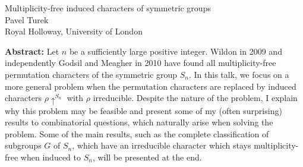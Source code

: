 \documentclass[12pt,a4paper]{article}
\begin{document}
\thispagestyle{empty} 
\begin{center}
{\large Multiplicity-free induced characters of symmetric groups}\\
\vspace*{.5cm}
Pavel Turek\\
Royal Holloway, University of London\\
\end{center}
\vspace*{.8cm}

{\bf Abstract:} Let $n$ be a sufficiently large positive integer. Wildon in 2009 and independently Godsil and Meagher in 2010 have found all multiplicity-free permutation characters of the symmetric group $S_n$. In this talk, we focus on a more general problem when the permutation characters are replaced by induced characters $\rho\!\uparrow^{S_n}$ with $\rho$ irreducible. Despite the nature of the problem, I explain why this problem may be feasible and present some of my (often surprising) results to combinatorial questions, which naturally arise when solving the problem. Some of the main results, such as the complete classification of subgroups $G$ of $S_n$, which have an irreducible character which stays multiplicity-free when induced to $S_n$, will be presented at the end.
\end{document}
